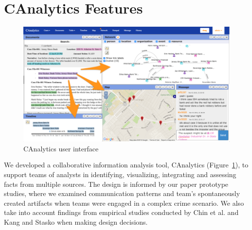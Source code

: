 \section{CAnalytics Features}\label{canalytics-features}

\begin{figure}
	\centering
    \label{fig:interface}
	\includegraphics{./img/interface.png}
	\caption{CAnalytics user interface}
\end{figure}

We developed a collaborative information analysis tool, CAnalytics (Figure~\ref{fig:interface}), to
support teams of analysts in identifying, visualizing, integrating and
assessing facts from multiple sources. The design is informed by our
paper prototype studies, where we examined communication patterns and
team's spontaneously created artifacts when teams were engaged in a
complex crime scenario. We also take into account findings from
empirical studies conducted by Chin et al. \autocite{Chin2009} and Kang
and Stasko \autocite{Kang2011} when making design decisions.

